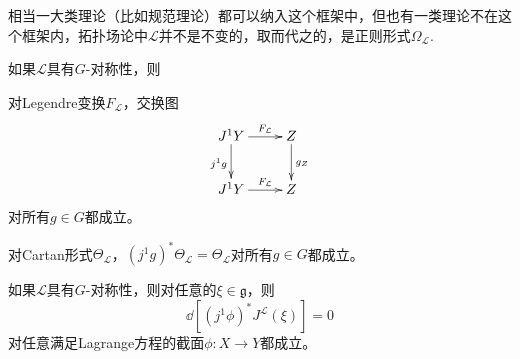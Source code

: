 相当一大类理论（比如规范理论）都可以纳入这个框架中，但也有一类理论不在这个框架内，拓扑场论中$\mathcal L$并不是不变的，取而代之的，是正则形式$\Omega_{\mathcal L}$.

\begin{pro}
    如果$\mathcal L$具有$G$-对称性，则
    \begin{compactenum}
        \item 对Legendre变换$F_{\mathcal L}$，交换图
        \[
            \xymatrix{
                J^1Y\ar[r]^-{F_{\mathcal L}}\ar[d]_{j^1g}&Z\ar[d]^{g_Z}\\ 
                J^1Y\ar[r]^-{F_{\mathcal L}}&Z
            }
        \]
        对所有$g\in G$都成立。
        \item 对Cartan形式$\Theta_{\mathcal L}$，$(j^1g)^*\Theta_{\mathcal L}=\Theta_{\mathcal L}$对所有$g\in G$都成立。
    \end{compactenum}
\end{pro}

\begin{thm}[Noether定理]
    如果$\mathcal L$具有$G$-对称性，则对任意的$\xi\in \mathfrak g$，则
    \[
        \dd \left[ (j^1\phi)^*J^{\mathcal L}(\xi)\right]=0
    \]
    对任意满足Lagrange方程的截面$\phi:X\to Y$都成立。
\end{thm}